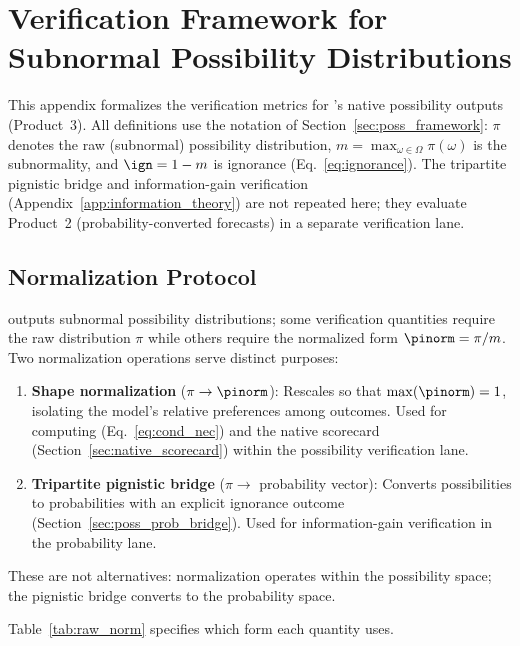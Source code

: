 \section{Verification Framework for Subnormal Possibility Distributions}\label{app:verification_framework}

This appendix formalizes the verification metrics for \clyfar{}'s native possibility outputs (Product~3). All definitions use the notation of Section~\ref{sec:poss_framework}: $\pi$ denotes the raw (subnormal) possibility distribution, $m = \max_{\omega \in \Omega} \pi(\omega)$ is the subnormality, and $\ign = 1 - m$ is ignorance (Eq.~\eqref{eq:ignorance}). The tripartite pignistic bridge and information-gain verification (Appendix~\ref{app:information_theory}) are not repeated here; they evaluate Product~2 (probability-converted forecasts) in a separate verification lane.

\subsection{Normalization Protocol}\label{sec:norm_protocol}

\clyfar{} outputs subnormal possibility distributions; some verification quantities require the raw distribution $\pi$ while others require the normalized form $\pinorm = \pi / m$. Two normalization operations serve distinct purposes:

\begin{enumerate}[leftmargin=2em]
\item \textbf{Shape normalization} ($\pi \to \pinorm$): Rescales so that $\max(\pinorm) = 1$, isolating the model's relative preferences among outcomes. Used for computing \Nc{} (Eq.~\eqref{eq:cond_nec}) and the native scorecard (Section~\ref{sec:native_scorecard}) within the possibility verification lane.
\item \textbf{Tripartite pignistic bridge} ($\pi \to$ probability vector): Converts possibilities to probabilities with an explicit ignorance outcome (Section~\ref{sec:poss_prob_bridge}). Used for information-gain verification in the probability lane.
\end{enumerate}

These are not alternatives: normalization operates within the possibility space; the pignistic bridge converts to the probability space.

Table~\ref{tab:raw_norm} specifies which form each quantity uses.

